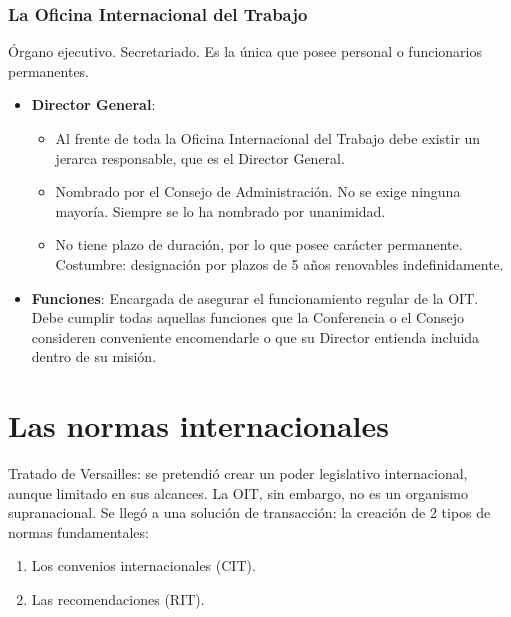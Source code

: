 \documentclass[spanish,12pt,a4paper,titlepage]{report}
\begin{document}
\subsubsection{La Oficina Internacional del Trabajo}
\label{sec:La Oficina Internacional del Trabajo}

Órgano ejecutivo.
Secretariado. Es la única que posee personal o funcionarios permanentes.

\begin{itemize}
\item \textbf{Director General}: 
  \begin{itemize}
  \item Al frente de toda la Oficina Internacional del Trabajo debe existir un jerarca responsable, que es el Director General.
  \item Nombrado por el Consejo de Administración. No se exige ninguna mayoría. Siempre se lo ha nombrado por unanimidad.
  \item No tiene plazo de duración, por lo que posee carácter permanente. Costumbre: designación por plazos de 5 años renovables indefinidamente.
  \end{itemize}
\item \textbf{Funciones}: Encargada de asegurar el funcionamiento regular de la OIT. Debe cumplir todas aquellas funciones que la Conferencia o el Consejo consideren conveniente encomendarle o que su Director entienda incluida dentro de su misión.
\end{itemize}

\section{Las normas internacionales}
\label{sec:las-normas-internacionales}

Tratado de Versailles: se pretendió crear un poder legislativo internacional, aunque limitado en sus alcances. La OIT, sin embargo, no es un organismo supranacional. Se llegó a una solución de transacción: la creación de 2 tipos de normas fundamentales: 

\begin{enumerate}
\item Los convenios internacionales (CIT).
\item Las recomendaciones (RIT).
\end{enumerate}
\end{document}
